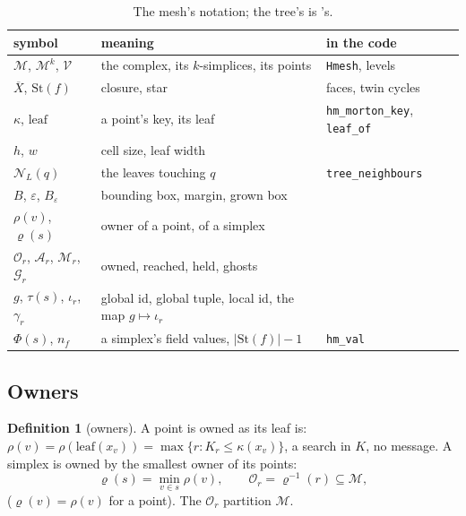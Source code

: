 \documentclass[10pt,a4paper]{article}
\theoremstyle{definition}
\newtheorem{definition}{Definition}
\newcommand{\fn}[1]{\texttt{#1}}
\begin{document}
\begin{table}[H]
  \centering\small
  \begin{tabular}{@{}l l l@{}}
    \toprule
    symbol & meaning & in the code \\
    \midrule
    $\mathcal{M}$, $\mathcal{M}^k$, $\mathcal{V}$ & the complex, its
      $k$-simplices, its points & \fn{Hmesh}, levels \\
    $\overline{X}$, $\mathrm{St}(f)$ & closure, star & faces, twin cycles \\
    $\kappa$, $\mathrm{leaf}$ & a point's key, its leaf &
      \fn{hm\_morton\_key}, \fn{leaf\_of} \\
    $h$, $w$ & cell size, leaf width & \\
    $\mathcal{N}_L(q)$ & the leaves touching $q$ & \fn{tree\_neighbours} \\
    $B$, $\varepsilon$, $B_\varepsilon$ & bounding box, margin, grown box
      & \\
    $\rho(v)$, $\varrho(s)$ & owner of a point, of a simplex & \\
    $\mathcal{O}_r$, $\mathcal{A}_r$, $\mathcal{M}_r$, $\mathcal{G}_r$ &
      owned, reached, held, ghosts & \\
    $g$, $\tau(s)$, $\iota_r$, $\gamma_r$ & global id, global tuple,
      local id, the map $g \mapsto \iota_r$ & \\
    $\Phi(s)$, $n_f$ & a simplex's field values, $|\mathrm{St}(f)| - 1$ &
      \fn{hm\_val} \\
    \bottomrule
  \end{tabular}
  \caption{The mesh's notation; the tree's is \cite{bamrpart}'s.}
  \label{tab:part-notation}
\end{table}

\subsection{Owners}
\label{sec:part-owner}

\begin{definition}[owners]
  A point is owned as its leaf is: $\rho(v) = \rho(\mathrm{leaf}(x_v)) =
  \max\{ r : K_r \le \kappa(x_v) \}$, a search in $K$, no message. A
  simplex is owned by the smallest owner of its points:
  \[
    \varrho(s) = \min_{v \in s} \rho(v), \qquad \mathcal{O}_r =
      \varrho^{-1}(r) \subseteq \mathcal{M},
  \]
  ($\varrho(v) = \rho(v)$ for a point). The $\mathcal{O}_r$ partition
  $\mathcal{M}$.
\end{definition}
\end{document}

